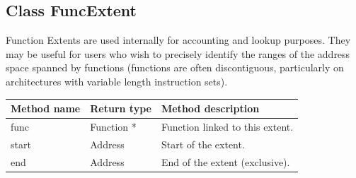 \subsection{Class FuncExtent}


Function Extents are used internally for accounting and lookup purposes. They may be useful for users who wish to precisely identify the ranges of the address space spanned by functions (functions are often discontiguous, particularly on architectures with variable length instruction sets).


\begin{tabularx}{\textwidth}{llX}
\toprule
Method name & Return type & Method description \\
\midrule
func & Function * & Function linked to this extent. \\
start & Address & Start of the extent. \\
end & Address & End of the extent (exclusive). \\
\bottomrule
\end{tabularx}


